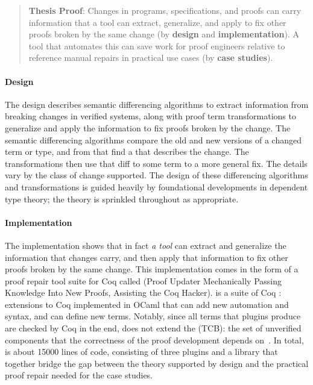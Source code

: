 \begin{quote}
\textbf{Thesis Proof}: Changes in programs, specifications, and proofs can carry information that a tool can extract, generalize, and apply to fix other proofs broken by the same change (by \textbf{design} and \textbf{implementation}). A tool that automates this can save work for proof engineers relative to reference manual repairs in practical use cases (by \textbf{case studies}).
\end{quote}

\paragraph{Design}
The design describes semantic differencing algorithms to extract information from breaking changes in verified systems,
along with proof term transformations to generalize and apply the information to fix proofs broken by the change.
The semantic differencing algorithms compare the old and new versions of a changed term or type,
and from that find a  that describes the change.
The transformations then use that diff to  some term to a more general fix.
The details vary by the class of change supported.
The design of these differencing algorithms and transformations is guided heavily by foundational developments in dependent type theory;
the theory is sprinkled throughout as appropriate.

\paragraph{Implementation}
The implementation shows that in fact \textit{a tool} can extract and generalize the information that changes carry,
and then apply that information to fix other proofs broken by the same change.
This implementation comes in the form of a proof repair tool suite for Coq called \intro{\sysnamelong} (Proof Updater Mechanically Passing Knowledge Into New Proofs, Assisting the Coq Hacker).
\sysnamelong is a suite of Coq : extensions to Coq implemented in OCaml that can add new automation and syntax, and can define new terms.
Notably, since all terms that plugins produce are checked by Coq in the end, \sysnamelong does not extend the  (TCB):
the set of unverified components that the correctness of the proof development depends on~\cite{PGL-045}.
In total, \sysnamelong is about 15000 lines of code,
consisting of three plugins and a library that together bridge the gap between the theory supported by design and the practical proof repair needed for the case studies.

